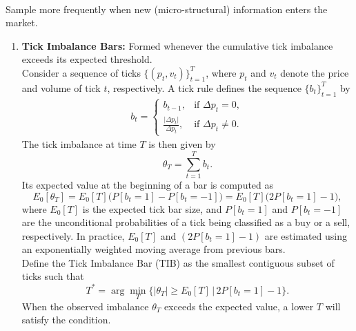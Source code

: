 \begin{remark} \\
Sample more frequently when new (micro-structural) information enters the market.
\begin{enumerate}[label=\roman*.]
\setlength{\itemsep}{0pt}
\item \textbf{Tick Imbalance Bars:} Formed whenever the cumulative tick imbalance exceeds its expected threshold.\\
Consider a sequence of ticks $\{(p_t, v_t)\}_{t=1}^{T}$, where $p_t$ and $v_t$ denote the price and volume of tick $t$, respectively. A tick rule defines the sequence $\{b_t\}_{t=1}^{T}$ by
\begin{align}
b_t =
\begin{cases}
b_{t-1}, & \text{if } \Delta p_t = 0, \\
\frac{\lvert \Delta p_t \rvert}{\Delta p_t}, & \text{if } \Delta p_t \neq 0.
\end{cases} \nonumber
\end{align}
The tick imbalance at time $T$ is then given by
\[ \theta_T = \sum_{t=1}^{T} b_t. \]
Its expected value at the beginning of a bar is computed as
\[ E_0[\theta_T] = E_0[T]\big(P[b_t = 1] - P[b_t = -1]\big) = E_0[T]\big(2P[b_t = 1] - 1\big), \]
where $E_0[T]$ is the expected tick bar size, and $P[b_t = 1]$ and $P[b_t = -1]$ are the unconditional probabilities of a tick being classified as a buy or a sell, respectively. In practice, $E_0[T]$ and $(2P[b_t = 1] - 1)$ are estimated using an exponentially weighted moving average from previous bars.\\
Define the Tick Imbalance Bar (TIB) as the smallest contiguous subset of ticks such that
\[ T^{*} = \arg \min_T \{ \lvert \theta_T \rvert \geq E_0[T] \, \vert \, 2P[b_t = 1] - 1 \}. \]
When the observed imbalance $\theta_T$ exceeds the expected value, a lower $T$ will satisfy the condition.


\end{enumerate}
\end{remark}

